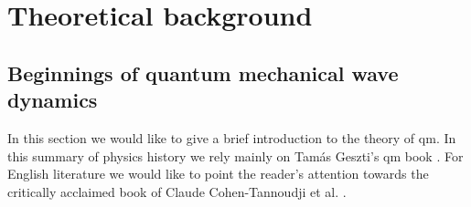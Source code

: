 \section{Theoretical background}
\label{sec:theory}

\subsection{Beginnings of quantum mechanical wave dynamics}

In this section we would like to give a brief introduction to the theory of \acrshort{qm}. In this summary of physics history we rely mainly on Tamás Geszti's \acrshort{qm} book \cite{geszti2007}.
For English literature we would like to point the reader's attention towards the critically acclaimed book of Claude Cohen-Tannoudji et al. \cite{tannoudjiVol1}.
%
